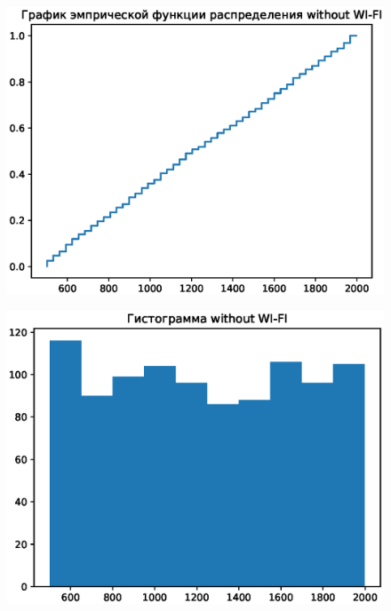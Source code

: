 \documentclass{article}
\begin{document}
\begin{figure}[!h]
\begin{center}
\includegraphics [scale=0.4]{images/ecdf3.eps}
\end{center}
\end{figure}

\begin{figure}[!h]
\begin{center}
\includegraphics [scale=0.4]{images/hist3.eps}
\end{center}
\end{figure}
\end{document}
